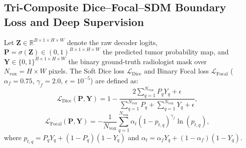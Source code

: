 \documentclass[journal,onecolumn,10pt]{IEEEtran}
\begin{document}
\subsection{Tri-Composite Dice--Focal--SDM Boundary Loss and Deep Supervision}
Let $\mathbf{Z} \in \mathbb{R}^{B \times 1 \times H \times W}$ denote the raw decoder logits, $\mathbf{P} = \sigma(\mathbf{Z}) \in (0,1)^{B \times 1 \times H \times W}$ the predicted tumor probability map, and $\mathbf{Y} \in \{0,1\}^{B \times 1 \times H \times W}$ the binary ground-truth radiologist mask over $N_{\text{vox}} = H \times W$ pixels. The Soft Dice loss $\mathcal{L}_{\text{Dice}}$ and Binary Focal loss $\mathcal{L}_{\text{Focal}}$ ($\alpha_f = 0.75$, $\gamma_f = 2.0$, $\epsilon = 10^{-5}$) are defined as:
\begin{equation}
    \mathcal{L}_{\text{Dice}}(\mathbf{P}, \mathbf{Y}) = 1 - \frac{2 \sum_{q=1}^{N_{\text{vox}}} P_q Y_q + \epsilon}{\sum_{q=1}^{N_{\text{vox}}} P_q + \sum_{q=1}^{N_{\text{vox}}} Y_q + \epsilon},
    \label{eq:dice_loss}
\end{equation}
\begin{equation}
    \mathcal{L}_{\text{Focal}}(\mathbf{P}, \mathbf{Y}) = -\frac{1}{N_{\text{vox}}}\sum_{q=1}^{N_{\text{vox}}} \alpha_t (1 - p_{t,q})^{\gamma_f} \ln(p_{t,q}),
    \label{eq:focal_loss}
\end{equation}
where $p_{t,q} = P_q Y_q + (1 - P_q)(1 - Y_q)$ and $\alpha_t = \alpha_f Y_q + (1 - \alpha_f)(1 - Y_q)$.
\end{document}
